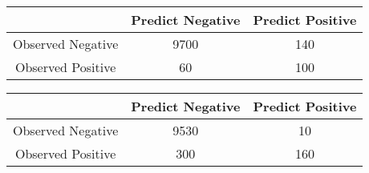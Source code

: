 \documentclass[a4paper,12pt]{article}
\begin{document}
\begin{center}
\begin{tabular}{|c|c|c|}
\hline  & Predict Negative & Predict Positive \\ 
\hline Observed Negative &	9700	&	140	\\ 
\hline Observed Positive & 	60	&	100	\\ 
\hline 
\end{tabular} 
\end{center}

\begin{center}
\begin{tabular}{|c|c|c|}
\hline  & Predict Negative & Predict Positive \\ 
\hline Observed Negative &	9530	&	10	\\ 
\hline Observed Positive & 	300	&	160	\\ 
\hline 
\end{tabular} 
\end{center}
			
\end{document}
